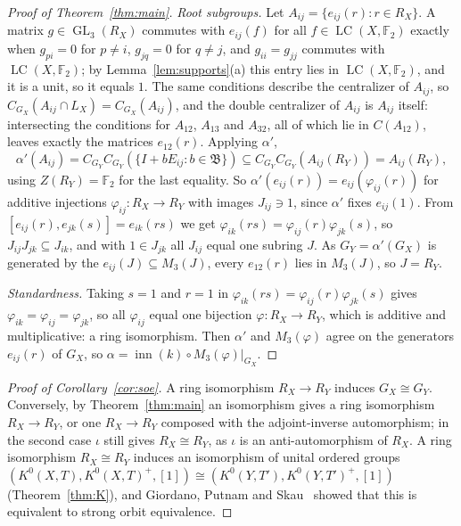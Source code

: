 \documentclass[11pt]{amsart}
\theoremstyle{remark}
\newcommand{\F}{\mathbb F}
\newcommand{\LC}{\operatorname{LC}}
\newcommand{\GL}{\operatorname{GL}}
\newcommand{\inn}{\operatorname{inn}}
\begin{document}
\begin{proof}[Proof of Theorem~\ref{thm:main}]
\emph{Root subgroups.} Let $A_{ij}=\{e_{ij}(r):r\in R_X\}$. A matrix
$g\in\GL_3(R_X)$ commutes with $e_{ij}(f)$ for all $f\in\LC(X,\F_2)$ exactly
when $g_{pi}=0$ for $p\ne i$, $g_{jq}=0$ for $q\ne j$, and
$g_{ii}=g_{jj}$ commutes with $\LC(X,\F_2)$; by
Lemma~\ref{lem:supports}(a) this entry lies in $\LC(X,\F_2)$, and it is a
unit, so it equals $1$. The same conditions describe the centralizer of
$A_{ij}$, so $C_{G_X}(A_{ij}\cap L_X)=C_{G_X}(A_{ij})$, and the
double centralizer of $A_{ij}$ is $A_{ij}$ itself: intersecting the
conditions for $A_{12}$, $A_{13}$ and $A_{32}$, all of which lie in
$C(A_{12})$, leaves exactly the matrices $e_{12}(r)$. Applying $\alpha'$,
\[
  \alpha'(A_{ij})=C_{G_Y}C_{G_Y}(\{I+bE_{ij}:b\in\mathfrak B\})
  \subseteq C_{G_Y}C_{G_Y}(A_{ij}(R_Y))=A_{ij}(R_Y),
\]
using $Z(R_Y)=\F_2$ for the last equality. So
$\alpha'(e_{ij}(r))=e_{ij}(\varphi_{ij}(r))$ for additive injections
$\varphi_{ij}\colon R_X\to R_Y$ with images $J_{ij}\ni1$, since $\alpha'$
fixes $e_{ij}(1)$. From $[e_{ij}(r),e_{jk}(s)]=e_{ik}(rs)$ we get
$\varphi_{ik}(rs)=\varphi_{ij}(r)\varphi_{jk}(s)$, so $J_{ij}J_{jk}\subseteq J_{ik}$,
and with $1\in J_{jk}$ all $J_{ij}$ equal one subring $J$. As
$G_Y=\alpha'(G_X)$ is generated by the $e_{ij}(J)\subseteq M_3(J)$, every
$e_{12}(r)$ lies in $M_3(J)$, so $J=R_Y$.

\emph{Standardness.} Taking $s=1$ and $r=1$ in
$\varphi_{ik}(rs)=\varphi_{ij}(r)\varphi_{jk}(s)$ gives
$\varphi_{ik}=\varphi_{ij}=\varphi_{jk}$, so all $\varphi_{ij}$ equal one
bijection $\varphi\colon R_X\to R_Y$, which is additive and multiplicative:
a ring isomorphism. Then $\alpha'$ and $M_3(\varphi)$ agree on the
generators $e_{ij}(r)$ of $G_X$, so $\alpha=\inn(k)\circ M_3(\varphi)|_{G_X}$.
\end{proof}

\begin{proof}[Proof of Corollary~\ref{cor:soe}]
A ring isomorphism $R_X\to R_Y$ induces $G_X\cong G_Y$. Conversely, by
Theorem~\ref{thm:main} an isomorphism gives a ring isomorphism
$R_X\to R_Y$, or one $R_X\to R_Y$ composed with the adjoint-inverse
automorphism; in the second case $\iota$ still gives $R_X\cong R_Y$, as
$\iota$ is an anti-automorphism of $R_X$. A ring isomorphism $R_X\cong R_Y$
induces an isomorphism of unital ordered groups
$(K^0(X,T),K^0(X,T)^+,[1])\cong(K^0(Y,T'),K^0(Y,T')^+,[1])$
(Theorem~\ref{thm:K}), and Giordano, Putnam and Skau~\cite{GPS} showed that
this is equivalent to strong orbit equivalence.
\end{proof}
\end{document}
